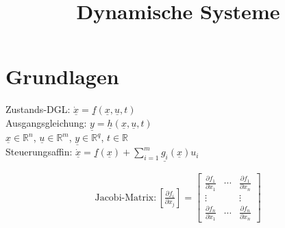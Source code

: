 \documentclass[german]{latex4ei/latex4ei_sheet}
\title{Dynamische Systeme}
\begin{document}
\ifdefined\GitRevision{}\fi

\maketitle

\section{Grundlagen}
\begin{sectionbox}
Zustands-DGL: $\underline{\dot{x}} =  \underline{f}\left( \underline{x}, \underline{u}, t \right) $ \\
Ausgangsgleichung: $\underline{y} = \underline{h} \left( \underline{x}, \underline{u}, t \right)$ \\
$\underline{x} \in \mathbb{R}^n$, $\underline{u} \in \mathbb{R}^m$, $\underline{y} \in \mathbb{R}^q$, $t \in \mathbb{R}$\\

Steuerungsaffin: $\underline{\dot{x}} = \underline{f}(\underline{x}) + \sum_{i=1}^{m} \underline{g_i}(\underline{x}) u_i$

\begin{align*}
\text{Jacobi-Matrix:} \,
\left[ \frac{\partial f_i}{\partial x_j} \right] =
\begin{bmatrix}
  \frac{\partial f_1}{\partial x_1} &   \cdots  &   \frac{\partial f_1}{\partial x_n} \\
  \vdots                            &           &   \vdots \\
  \frac{\partial f_n}{\partial x_1} &   \cdots  &   \frac{\partial f_n}{\partial x_n}
\end{bmatrix}
\end{align*}
\end{sectionbox}
\end{document}
